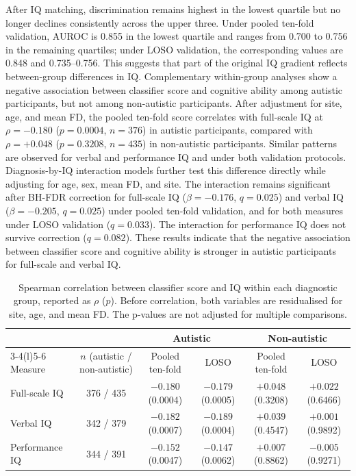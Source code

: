 After IQ matching, discrimination remains highest in the lowest quartile but no longer declines consistently across the upper three. Under pooled ten-fold validation, AUROC is 0.855 in the lowest quartile and ranges from 0.700 to 0.756 in the remaining quartiles; under LOSO validation, the corresponding values are 0.848 and 0.735--0.756. This suggests that part of the original IQ gradient reflects between-group differences in IQ. Complementary within-group analyses show a negative association between classifier score and cognitive ability among autistic participants, but not among non-autistic participants. After adjustment for site, age, and mean FD, the pooled ten-fold score correlates with full-scale IQ at $\rho=-0.180$ ($p=0.0004$, $n=376$) in autistic participants, compared with $\rho=+0.048$ ($p=0.3208$, $n=435$) in non-autistic participants. Similar patterns are observed for verbal and performance IQ and under both validation protocols. Diagnosis-by-IQ interaction models further test this difference directly while adjusting for age, sex, mean FD, and site. The interaction remains significant after BH-FDR correction for full-scale IQ ($\beta=-0.176$, $q=0.025$) and verbal IQ ($\beta=-0.205$, $q=0.025$) under pooled ten-fold validation, and for both measures under LOSO validation ($q=0.033$). The interaction for performance IQ does not survive correction ($q=0.082$). These results indicate that the negative association between classifier score and cognitive ability is stronger in autistic participants for full-scale and verbal IQ.

\begin{table}[t]
\centering
\caption{Spearman correlation between classifier score and IQ within each diagnostic group, reported as $\rho$ ($p$). Before correlation, both variables are residualised for site, age, and mean FD. The p-values are not adjusted for multiple comparisons.}
\label{tab:iq-correlations}
\small
\setlength{\tabcolsep}{4pt}
\begin{tabular}{@{}lccccc@{}}
\toprule
 & & \multicolumn{2}{c}{Autistic} & \multicolumn{2}{c}{Non-autistic} \\
\cmidrule(lr){3-4}\cmidrule(l){5-6}
Measure & $n$ (autistic / non-autistic) & Pooled ten-fold & LOSO & Pooled ten-fold & LOSO \\
\midrule
Full-scale IQ & 376 / 435 & $-0.180$ (0.0004) & $-0.179$ (0.0005) & $+0.048$ (0.3208) & $+0.022$ (0.6466) \\
Verbal IQ & 342 / 379 & $-0.182$ (0.0007) & $-0.189$ (0.0004) & $+0.039$ (0.4547) & $+0.001$ (0.9892) \\
Performance IQ & 344 / 391 & $-0.152$ (0.0047) & $-0.147$ (0.0062) & $+0.007$ (0.8862) & $-0.005$ (0.9271) \\
\bottomrule
\end{tabular}
\end{table}

